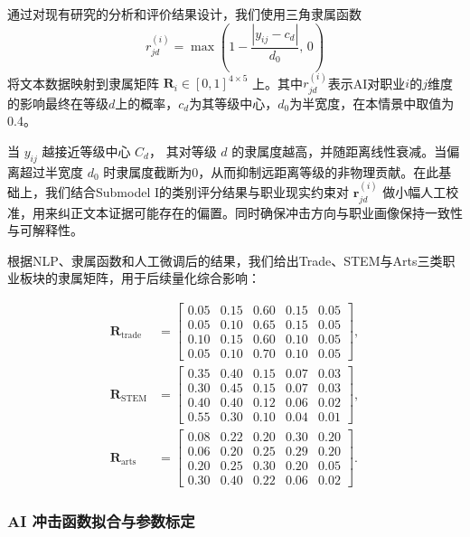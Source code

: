 \documentclass{mcmthesis}
\begin{document}
通过对现有研究的分析和评价结果设计，我们使用三角隶属函数
\begin{equation}
r_{jd}^{(i)}=\max\!\left(1-\frac{|y_{ij}-c_d|}{d_0},\,0\right)
\end{equation}
将文本数据映射到隶属矩阵 $\mathbf{R}_{i}\in[0,1]^{4\times 5}$ 上。其中$r_{jd}^{(i)}$表示AI对职业$i$的$j$维度的影响最终在等级$d$上的概率，$c_d$为其等级中心，$d_0$为半宽度，在本情景中取值为0.4。

当 $y_{ij}$ 越接近等级中心 $C_d$， 其对等级 $d$ 的隶属度越高，并随距离线性衰减。当偏离超过半宽度 $d_0$ 时隶属度截断为0，从而抑制远距离等级的非物理贡献。在此基础上，我们结合Submodel I的类别评分结果与职业现实约束对 $\mathbf{r}_{jd}^{(i)}$ 做小幅人工校准，用来纠正文本证据可能存在的偏置。同时确保冲击方向与职业画像保持一致性与可解释性。

\noindent
根据NLP、隶属函数和人工微调后的结果，我们给出Trade、STEM与Arts三类职业板块的隶属矩阵，用于后续量化综合影响：

\begin{align}
\mathbf{R}_{\text{trade}} &=
\begin{bmatrix}
0.05 & 0.15 & 0.60 & 0.15 & 0.05\\
0.05 & 0.10 & 0.65 & 0.15 & 0.05\\
0.10 & 0.15 & 0.60 & 0.10 & 0.05\\
0.05 & 0.10 & 0.70 & 0.10 & 0.05
\end{bmatrix}, \label{eq:R_trade}\\
\mathbf{R}_{\text{STEM}} &=
\begin{bmatrix}
0.35 & 0.40 & 0.15 & 0.07 & 0.03\\
0.30 & 0.45 & 0.15 & 0.07 & 0.03\\
0.40 & 0.40 & 0.12 & 0.06 & 0.02\\
0.55 & 0.30 & 0.10 & 0.04 & 0.01
\end{bmatrix}, \label{eq:R_stem}\\
\mathbf{R}_{\text{arts}} &=
\begin{bmatrix}
0.08 & 0.22 & 0.20 & 0.30 & 0.20\\
0.06 & 0.20 & 0.25 & 0.29 & 0.20\\
0.20 & 0.25 & 0.30 & 0.20 & 0.05\\
0.30 & 0.40 & 0.22 & 0.06 & 0.02
\end{bmatrix}. \label{eq:R_arts}
\end{align}

\subsubsection{AI 冲击函数拟合与参数标定}
\end{document}
